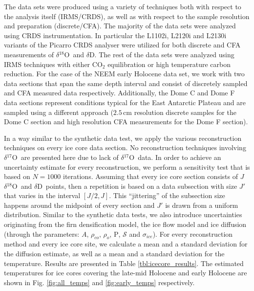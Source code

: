 \documentclass[11pt, draftcls, onecolumn]{IEEEtran} %
\numberwithin{equation}{section}
\numberwithin{table}{section}
\numberwithin{figure}{section}
\newcommand{\delOx}{$\delta{}^{18}\mathrm{O}$}
\newcommand{\delOxb}{$\delta{}^{17}\mathrm{O}$}
\newcommand{\delD}{$\delta\mathrm{D}$}
\begin{document}
The data sets were produced using a variety of techniques
both with respect to the analysis itself (IRMS/CRDS), as well as with respect to the sample resolution and preparation
(discrete/CFA). 
The majority of the data sets were analyzed using CRDS instrumentation. In particular the L1102i, L2120i and L2130i
variants of the Picarro CRDS analyser were utilized for both discrete and CFA measurements of \delOx~and \delD.
The rest of the data sets were analyzed using IRMS techniques with either $\mathrm{CO}_2$ equilibration or 
high temperature carbon reduction. 
For the case of the NEEM early Holocene data set, we work with two data sections that span the same 
depth interval and consist of discretely sampled and CFA measured data respectively.
Additionally, the Dome C and Dome F data sections represent conditions typical for the East Antarctic Plateau and are sampled
using a different approach ($2.5 \, \mathrm{cm}$ resolution discrete samples for the Dome C section and high resolution CFA measurements
for the Dome F section).

In a way similar to the synthetic data test, we apply the various reconstruction techniques on every ice core data
section. No reconstruction techniques involving \delOxb ~are presented here due to lack of 
\delOxb ~data. 
In order to achieve an uncertainty estimate for every reconstruction, we 
perform a sensitivity test that is based on $N = 1000$ iterations. 
Assuming that every ice core section 
consists of $J$ \delOx ~and \delD ~points, then a repetition is based on a 
data subsection with size $J'$ that varies in the interval $\left[ J/2, J \right]$. 
This ``jittering'' of the subsection size happens around the midpoint of every section and $J'$ is 
drawn from a uniform distribution. 
Similar to the synthetic data tests, we also introduce uncertainties originating from the firn densification model, the ice flow  model
and ice diffusion (through the parameters: $A$, $\rho_{co}$, $\rho_o$, $\mathrm{P}$, $\mathcal{S}$ and $\sigma_{ice}$).
For every reconstruction method and every ice core site, we
calculate a mean and a standard deviation for the diffusion estimate, as well as a mean and a standard 
deviation for the temperature. 
Results are presented in Table \ref{tbl:icecore_results}. 
The estimated temperatures for ice cores covering the late-mid Holocene and early Holocene are 
shown in Fig. \ref{fig:all_temps} and \ref{fig:early_temps} respectively.



\end{document}

